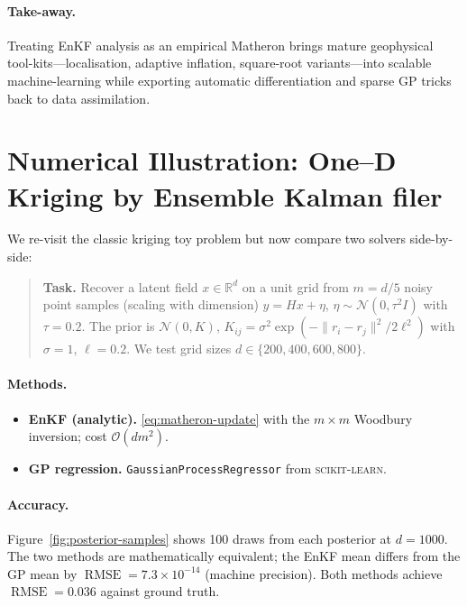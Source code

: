 \documentclass[runningheads]{llncs}
\begin{document}
\paragraph{Take-away.}
Treating EnKF analysis as an empirical Matheron  brings mature geophysical tool-kits—localisation, adaptive inflation, square-root variants—into scalable machine-learning while exporting automatic differentiation and sparse GP tricks back to data assimilation.

\section{Numerical Illustration:  One–D Kriging by Ensemble Kalman filer}
\label{sec:numerical-demo}

We re-visit the classic kriging toy problem but now compare two solvers side-by-side:

\begin{quote}
\textbf{Task.}  Recover a latent field
$x\!\in\!\mathbb R^{d}$ on a unit grid from
$m\!=\!d/5$ noisy point samples (scaling with dimension)
$y = Hx + \eta$, $\eta\!\sim\!\mathcal N(0,\tau^{2}I)$ with
$\tau=0.2$.  The prior is
$\mathcal N(0,K)$, $K_{ij}=\sigma^{2}\!\exp(-\lVert r_i-r_j\rVert^{2}/2\ell^{2})$
with $\sigma=1$, $\ell=0.2$.
We test grid sizes $d\in\{200,400,600,800\}$.
\end{quote}

\paragraph{Methods.}
\begin{itemize}
\item \textbf{EnKF (analytic).}  \eqref{eq:matheron-update} with the
      $m\!\times\!m$ Woodbury inversion; cost $\mathcal O(dm^{2})$.
\item \textbf{GP regression.}  \texttt{GaussianProcessRegressor}
      from \textsc{scikit-learn}.
\end{itemize}

\paragraph{Accuracy.}
Figure~\ref{fig:posterior-samples} shows 100 draws from each posterior at
$d=1000$.  The two methods are mathematically equivalent; the EnKF
mean differs from the GP mean by
$\operatorname{RMSE}=7.3\!\times\!10^{-14}$ (machine precision).
Both methods achieve $\operatorname{RMSE}=0.036$ against ground truth.
\end{document}
